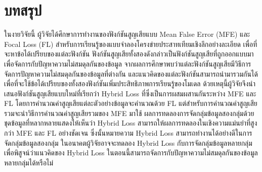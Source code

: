 \chapter{บทสรุป}
\label{chapter:conclusion}

ในงายวิจัยนี้ ผู้วิจัยได้ศึกษาการทำงานของฟังก์ชันสูญเสียแบบ Mean False Error (MFE) และ Focal Loss (FL) สำหรับการเรียนรู้ของแบบจำลองโครงข่ายประสาทเทียมเชิงลึกอย่างละเอียด เพื่อที่จะหาข้อได้เปรียบของแต่ละฟังก์ชัน ฟังก์ชันสูญเสียทั้งสองดังกล่าวเป็นฟังก์ชันสูญเสียที่ถูกออกแบบมาเพื่อจัดการกับปัญหาความไม่สมดุลกันของข้อมูล
จากผลการศึกษาพบว่าแต่ละฟังก์ชันสูญเสียมีวิธีการจัดการปัญหาความไม่สมดุลกันของข้อมูลที่ต่างกัน และแนวคิดของแต่ละฟังก์ชันสามารถนำมารวมกันได้ เพื่อที่จะใช้ข้อได้เปรียบของทั้งสองฟังก์ชันเพิ่มประสิทธิภาพการเรียนรู้ของโมเดล ด้วยเหตุนี้ผู้วิจัยจึงนำเสนอฟังก์ชันสูญเสียแบบใหม่ที่เรียกว่า Hybrid Loss ที่ซึ่งเป็นการผสมผสานกันระหว่าง MFE และ FL โดยการคำนวณค่าสูญเสียแต่ละตัวอย่างข้อมูลจะคำนวณด้วย FL แต่สำหรับการคำนวณค่าสูญเสียรวมจะนำวิธีการคำนวณค่าสูญเสียรวมของ MFE มาใช้ ผลการทดลองการจัดกลุ่มข้อมูลสองกลุ่มด้วยชุดข้อมูลที่หลากหลายแสดงให้เห็นว่า Hybrid Loss สามารถให้ผลการทดลองในเชิงความแม่นยำที่สูงกว่า MFE และ FL อย่างชัดเจน ซึ่งนั้นหมายความ Hybrid Loss สามารถทำงานได้อย่างดีในการจัดกลุ่มข้อมูลสองกลุ่ม ในอนาคตผู้วิจัยอาจจะทดลอง Hybrid Loss กับการจัดกลุ่มข้อมูลหลายกลุ่ม เพื่อพิสูจน์ว่าแนวคิดของ Hybrid Loss ในตอนนี้สามารถจัดการกับปัญหาความไม่สมดุลกันของข้อมูลหลายกลุ่มได้หรือไม่